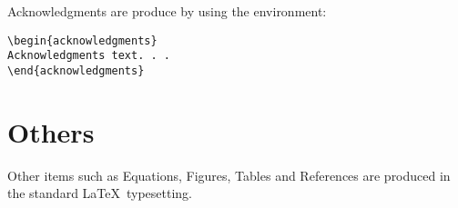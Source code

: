 \documentclass[manuscript]{clv3}
\begin{document}
Acknowledgments are produce by using the environment:
\\
\begin{verbatim}
\begin{acknowledgments}
Acknowledgments text. . .
\end{acknowledgments}
\end{verbatim}

\section{Others}

Other items such as Equations, Figures, Tables and References are produced in
the standard \LaTeX\ typesetting.

\starttwocolumn

\end{document}
